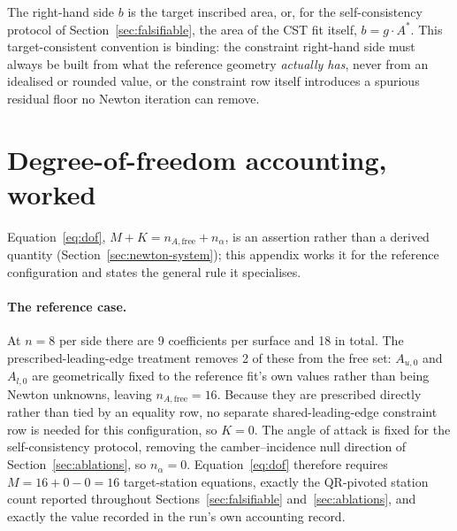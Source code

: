 The right-hand side $b$ is the target inscribed area, or, for the
self-consistency protocol of Section~\ref{sec:falsifiable}, the area of the
CST fit itself, $b=g\cdot A^\ast$. This target-consistent convention is
binding: the constraint right-hand side must always be built from what the
reference geometry \emph{actually has}, never from an idealised or rounded
value, or the constraint row itself introduces a spurious residual floor no
Newton iteration can remove.

\section{Degree-of-freedom accounting, worked}
\label{app:dof}

Equation~\eqref{eq:dof}, $M+K=n_{A,\text{free}}+n_\alpha$, is an assertion
rather than a derived quantity (Section~\ref{sec:newton-system}); this
appendix works it for the reference configuration and states the general rule
it specialises.

\paragraph{The reference case.} At $n=8$ per side there are 9 coefficients per
surface and 18 in total. The prescribed-leading-edge treatment removes 2 of
these from the free set: $A_{u,0}$ and $A_{l,0}$ are geometrically fixed to
the reference fit's own values rather than being Newton unknowns, leaving
$n_{A,\text{free}}=16$. Because they are prescribed directly rather than tied
by an equality row, no separate shared-leading-edge constraint row is needed
for this configuration, so $K=0$. The angle of attack is fixed for the
self-consistency protocol, removing the camber--incidence null direction of
Section~\ref{sec:ablations}, so $n_\alpha=0$. Equation~\eqref{eq:dof}
therefore requires $M = 16 + 0 - 0 = 16$ target-station equations, exactly the
QR-pivoted station count reported throughout
Sections~\ref{sec:falsifiable} and~\ref{sec:ablations}, and exactly the value
recorded in the run's own accounting record.


